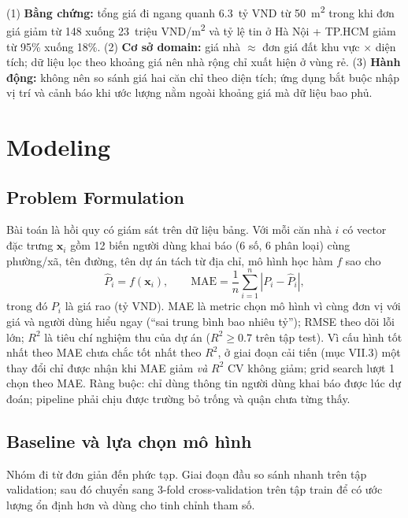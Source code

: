 \documentclass[11pt]{article}
\newcommand{\ty}{tỷ VND}
\newcommand{\trm}{triệu VND/m\textsuperscript{2}}
\newcommand{\mtwo}{m\textsuperscript{2}}
\begin{document}
\begin{greenbox}
(1) \textbf{Bằng chứng:} tổng giá đi ngang quanh 6.3~\ty{} từ 50~\mtwo{} trong khi đơn giá giảm từ 148
xuống 23~\trm{} và tỷ lệ tin ở Hà Nội + TP.HCM giảm từ 95\% xuống 18\%. (2) \textbf{Cơ sở domain:} giá nhà
$\approx$ đơn giá đất khu vực $\times$ diện tích; dữ liệu lọc theo khoảng giá nên nhà rộng chỉ xuất hiện ở
vùng rẻ. (3) \textbf{Hành động:} không nên so sánh giá hai căn chỉ theo diện tích; ứng dụng bắt buộc nhập
vị trí và cảnh báo khi ước lượng nằm ngoài khoảng giá mà dữ liệu bao phủ.
\end{greenbox}

\section{Modeling}

\subsection{Problem Formulation}

Bài toán là hồi quy có giám sát trên dữ liệu bảng. Với mỗi căn nhà $i$ có vector đặc trưng $\mathbf{x}_i$
gồm 12 biến người dùng khai báo (6 số, 6 phân loại) cùng phường/xã, tên đường, tên dự án tách từ địa chỉ,
mô hình học hàm $f$ sao cho
\[
    \hat{P}_i = f(\mathbf{x}_i), \qquad
    \mathrm{MAE} = \frac{1}{n}\sum_{i=1}^{n} \left| P_i - \hat{P}_i \right| ,
\]
trong đó $P_i$ là giá rao (\ty). MAE là metric chọn mô hình vì cùng đơn vị với giá và người dùng hiểu ngay
(``sai trung bình bao nhiêu tỷ''); RMSE theo dõi lỗi lớn; $R^2$ là tiêu chí nghiệm thu của dự án
($R^2 \geq 0.7$ trên tập test). Vì cấu hình tốt nhất theo MAE chưa chắc tốt nhất theo $R^2$, ở giai đoạn cải
tiến (mục VII.3) một thay đổi chỉ được nhận khi MAE giảm \textit{và} $R^2$ CV không giảm; grid search lượt 1
chọn theo MAE. Ràng buộc: chỉ dùng thông tin người
dùng khai báo được lúc dự đoán; pipeline phải chịu được trường bỏ trống và quận chưa từng thấy.

\subsection{Baseline và lựa chọn mô hình}

Nhóm đi từ đơn giản đến phức tạp. Giai đoạn đầu so sánh nhanh trên tập validation; sau đó chuyển sang
3-fold cross-validation trên tập train để có ước lượng ổn định hơn và dùng cho tinh chỉnh tham số.
\end{document}
